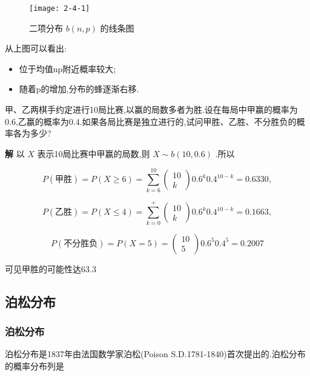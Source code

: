 \begin{figure}
	\centering
	\texttt{[image: 2-4-1]}
	\caption{二项分布 $ b(n,p) $ 的线条图}
	\label{fig:2.4.1}
\end{figure}

从上图可以看出:
\begin{itemize}
	\item 位于均值np附近概率较大;
	\item 随着p的增加,分布的蜂逐渐右移.
\end{itemize}

\begin{example}\label{exam:2.4.3}
	甲、乙两棋手约定进行10局比赛,以赢的局数多者为胜.设在每局中甲赢的概率为0.6,乙赢的概率为0.4.如果各局比赛是独立进行的,试问甲胜、乙胜、不分胜负的概率各为多少?
	
	\textbf{解} 以 $ X $ 表示10局比赛中甲赢的局数,则 $ X \sim b(10,0.6) $ .所以
	
	\[
	P(\text{甲胜})= P(X \geqslant 6)=\sum_{k=6}^{10} \left( 
	\begin{array}{l}{10} \\ 
	{k}
	\end{array}
	\right) 
	0.6^{k} 0.4^{10-k}=0.6330 ,
	\]
	
	\[
	P(\text{乙胜}) =P(X \leqslant 4)=\sum_{k=0}^{+} \left( 
	\begin{array}{c}{10} \\ 
	{k}
	\end{array}
	\right) 
	0.6^{k} 0.4^{10-k}=0.1663 ,
	\]
	
	\[
	P(\text{不分胜负})=P(X=5)=\left( \begin{array}{c}{10} \\ {5}\end{array}\right) 0.6^{5} 0.4^{5}=0.2007
	\]
	
	可见甲胜的可能性达63.3%
\end{example}

\subsection{泊松分布}\label{ssec:2.4.2}

\subsubsection{泊松分布}

泊松分布是1837年由法国数学家泊松(Poison S.D.1781-1840)首次提出的.泊松分布的概率分布列是


